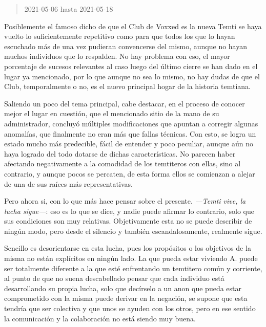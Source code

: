 \documentclass[
  spanish,
]{book}
\begin{document}
\begin{quote}
2021-05-06 hasta 2021-05-18
\end{quote}

Posiblemente el famoso dicho de que el Club de Voxxed es la nueva Temti se haya vuelto lo suficientemente repetitivo como para que todos los que lo hayan escuchado más de una vez pudieran convencerse del mismo, aunque no hayan muchos individuos que lo respalden. No hay problema con eso, el mayor porcentaje de sucesos relevantes al caso luego del último cierre se han dado en el lugar ya mencionado, por lo que aunque no sea lo mismo, no hay dudas de que el Club, temporalmente o no, es el nuevo principal hogar de la historia temtiana.

Saliendo un poco del tema principal, cabe destacar, en el proceso de conocer mejor el lugar en cuestión, que el mencionado sitio de la mano de su administrador, concluyó múltiples modificaciones que apuntan a corregir algunas anomalías, que finalmente no eran más que fallas técnicas. Con esto, se logra un estado mucho más predecible, fácil de entender y poco peculiar, aunque aún no haya logrado del todo dotarse de dichas características. No parecen haber afectando negativamente a la comodidad de los temtiteros con ellas, sino al contrario, y aunque pocos se percaten, de esta forma ellos se comienzan a alejar de una de sus raíces más representativas.

Pero ahora si, con lo que más hace pensar sobre el presente. \emph{---Temti vive, la lucha sigue---}: eso es lo que se dice, y nadie puede afirmar lo contrario, solo que sus condiciones son muy relativas. Objetivamente esta no se puede describir de ningún modo, pero desde el silencio y también escandalosamente, realmente sigue.

Sencillo es desorientarse en esta lucha, pues los propósitos o los objetivos de la misma no están explícitos en ningún lado. La que pueda estar viviendo A. puede ser totalmente diferente a la que esté enfrentando un temtitero común y corriente, al punto de que no suena descabellado pensar que cada individuo está desarrollando su propia lucha, solo que decírselo a un anon que pueda estar comprometido con la misma puede derivar en la negación, se supone que esta tendría que ser colectiva y que unos se ayuden con los otros, pero en ese sentido la comunicación y la colaboración no está siendo muy buena.
\end{document}
